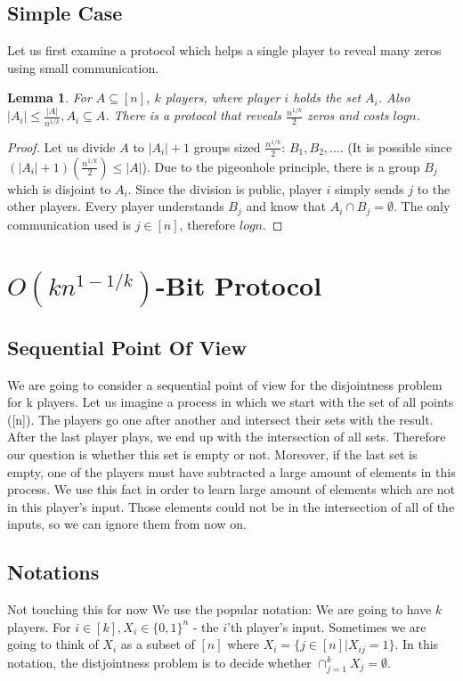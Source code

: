 \documentclass{article}
\newcommand{\Rnote}[1]{ { \color{magenta} #1 } }
\theoremstyle{plain}
\newtheorem{lemma}[theorem]{Lemma}
\begin{document}
\subsection{Simple Case} 
Let us first examine a protocol which helps a single player to reveal many zeros using small communication.
\begin{lemma}
    For $A \subseteq [n] $, $k$ players, where player $i$ holds the set $A_i$. Also $|A_i| \leq \frac{|A|}{n^{1/k}}, A_i \subseteq A$. There is a protocol that reveals $\frac{n^{1/k}}{2}$ zeros and costs $log{n}$. 
\end{lemma}
\begin{proof}
    Let us divide $A$ to $|A_i| + 1$ groups sized $\frac{n^{1/k}}{2}$: $B_1, B_2, ...$. (It is possible since $(|A_i| + 1)(\frac{n^{1/k}}{2}) \leq |A|$). Due to the pigeonhole principle, there is a group $B_j$ which is disjoint to $A_i$. \newline
    Since the division is public, player $i$ simply sends $j$ to the other players. Every player understands $B_j$ and know that $A_i \cap B_j = \emptyset$. 
    The only communication used is $j \in [n]$, therefore $log{n}$. 
\end{proof}
\section{$O(kn^{1-1/k})$-Bit Protocol}
\subsection{Sequential Point Of View}
We are going to consider a sequential point of view for the disjointness problem for k players. Let us imagine a process in which we start with the set of all points ([n]). The players go one after another and intersect their sets with the result. After the last player plays, we end up with the intersection of all sets. Therefore our question is whether this set is empty or not. Moreover, if the last set is empty, one of the players must have subtracted a large amount of elements in this process. We use this fact in order to learn large amount of elements which are not in this player's input. Those elements could not be in the intersection of all of the inputs, so we can ignore them from now on. 
\subsection{Notations}
\Rnote{Not touching this for now}
We use the popular notation: We are going to have $k$ players. For $i \in [k], X_i \in \{0,1\}^{n}$ - the $i$'th player's input. Sometimes we are going to think of $X_i$ as a subset of $[n]$ where $X_i = \{j \in [n] | X_{ij} = 1\}$. In this notation, the distjointness problem is to decide whether $\cap^{k}_{j=1}X_j = \emptyset$. \newline
\end{document}
